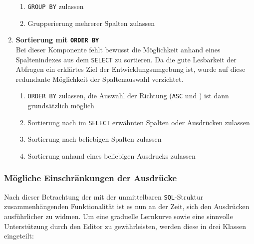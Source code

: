 \begin{enumerate}
  \begin{enumerate}[noitemsep]
  \item \label{feat:group-allow} \texttt{GROUP BY} zulassen
  \item \label{feat:group-multiple} Grupperierung mehrerer Spalten zulassen
  \end{enumerate}
\item \textbf{Sortierung mit \texttt{ORDER BY}} \\
  Bei dieser Komponente fehlt bewusst die Möglichkeit anhand eines Spaltenindexes aus dem \texttt{SELECT} zu sortieren. Da die gute Lesbarkeit der Abfragen ein erklärtes Ziel der Entwicklungsumgebung ist, wurde auf diese redundante Möglichkeit der Spaltenauswahl verzichtet.
  \begin{enumerate}[noitemsep]
  \item \label{feat:order-allow} \texttt{ORDER BY} zulassen, die Auswahl der Richtung (\texttt{ASC} und ) ist dann grundsätzlich möglich
  \item \label{feat:order-select} Sortierung nach im \texttt{SELECT} erwähnten Spalten oder Ausdrücken zulassen
  \item \label{feat:order-any-column} Sortierung nach beliebigen Spalten zulassen
  \item \label{feat:order-expression} Sortierung anhand eines beliebigen Ausdrucks zulassen
  \end{enumerate}
\end{enumerate}

\subsubsection{Mögliche Einschränkungen der Ausdrücke}
\label{sec:sql-subset-expression}

Nach dieser Betrachtung der mit der unmittelbaren \texttt{SQL}-Struktur zusammenhängenden Funktionalität ist es nun an der Zeit, sich den Ausdrücken ausführlicher zu widmen. Um eine graduelle Lernkurve sowie eine sinnvolle Unterstützung durch den Editor zu gewährleisten, werden diese in drei Klassen eingeteilt:

